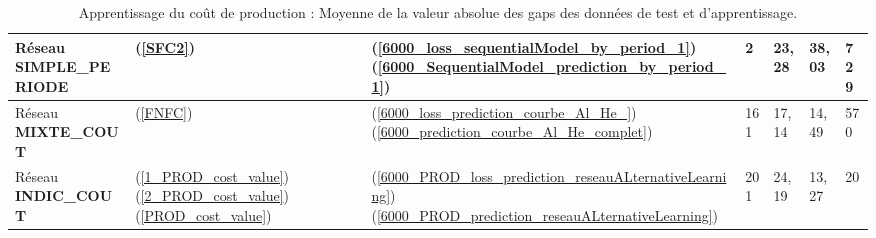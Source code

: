 \begin{table}[H]
\begin{center}
\begin{tabular}{|m{4.5cm}|m{2cm}|m{2.5cm}|m{1.9cm}|m{1.5cm}|m{1.5cm}|m{1.5cm}|}
	\hline
	Réseau \textbf{SIMPLE\_PERIODE}& (\ref{SFC2})& (\ref{6000_loss_sequentialModel_by_period_1}) (\ref{6000_SequentialModel_prediction_by_period_1})& 2&23,28 &38,03 & 729\\
	\hline
	Réseau \textbf{MIXTE\_COUT}&  (\ref{FNFC})& (\ref{6000_loss_prediction_courbe_Al_He_}) (\ref{6000_prediction_courbe_Al_He_complet}) &161&17,14 & 14,49&570\\
	\hline
	Réseau \textbf{INDIC\_COUT}&(\ref{1_PROD_cost_value})(\ref{2_PROD_cost_value}) (\ref{PROD_cost_value})&(\ref{6000_PROD_loss_prediction_reseauALternativeLearning})  (\ref{6000_PROD_prediction_reseauALternativeLearning}) &201&24,19 &13,27 & 20\\
	\hline
\end{tabular}
	\end{center}
\caption[Apprentissage du coût de production : Moyenne de la valeur absolue des gaps des données de test et d'apprentissage ]{Apprentissage du coût de production : Moyenne de la valeur absolue des gaps des données de test et d'apprentissage. \label{Gap}}
\end{table}

